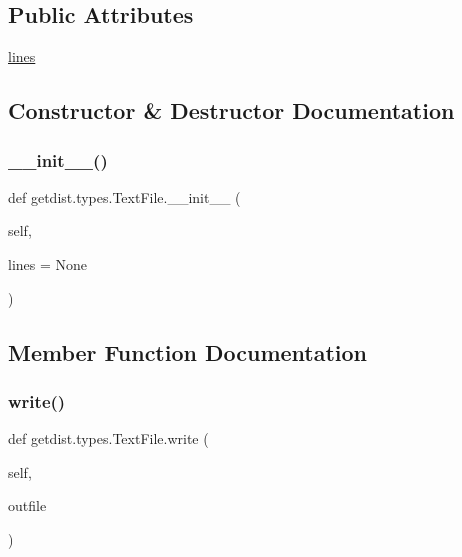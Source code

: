 \subsection*{Public Attributes}
\begin{DoxyCompactItemize}
\item 
\mbox{\hyperlink{classgetdist_1_1types_1_1TextFile_a77909f5b9e19390f0f00f8cf7a9147c3}{lines}}
\end{DoxyCompactItemize}


\subsection{Constructor \& Destructor Documentation}
\mbox{\label{classgetdist_1_1types_1_1TextFile_a83a6875569d28fc4238977c5a4cb9fdc}} 
\subsubsection{\texorpdfstring{\+\_\+\+\_\+init\+\_\+\+\_\+()}{\_\_init\_\_()}}
{\footnotesize\ttfamily def getdist.\+types.\+Text\+File.\+\_\+\+\_\+init\+\_\+\+\_\+ (\begin{DoxyParamCaption}\item[{}]{self,  }\item[{}]{lines = {\ttfamily None} }\end{DoxyParamCaption})}



\subsection{Member Function Documentation}
\mbox{\label{classgetdist_1_1types_1_1TextFile_a9e83c4be7d7b67c574f6a2d1eb668ccc}} 
\subsubsection{\texorpdfstring{write()}{write()}}
{\footnotesize\ttfamily def getdist.\+types.\+Text\+File.\+write (\begin{DoxyParamCaption}\item[{}]{self,  }\item[{}]{outfile }\end{DoxyParamCaption})}



